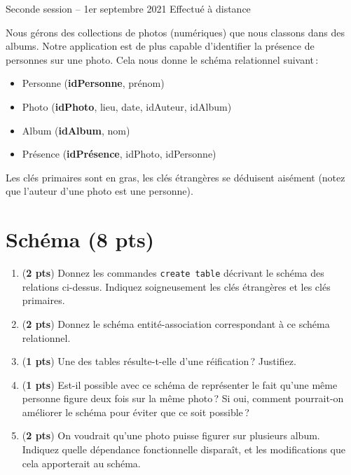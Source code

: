 %
{Seconde session -- 1er septembre 2021}%
{Effectué à distance}%

Nous gérons des collections de photos (numériques) que nous classons dans des albums. 
Notre application est de plus capable d'identifier la présence de personnes sur une
photo. Cela nous donne le schéma relationnel suivant\,:

      \begin{itemize}
        \item Personne (\textbf{idPersonne}, prénom)
        \item Photo (\textbf{idPhoto}, lieu, date, idAuteur, idAlbum)
        \item Album (\textbf{idAlbum}, nom)
        \item  Présence (\textbf{idPrésence}, idPhoto, idPersonne)
       \end{itemize}

Les clés primaires sont en gras, les clés étrangères se déduisent aisément (notez que l'auteur
d'une photo est une personne).


\section{Schéma (8 pts)}

\begin{enumerate}

   \item ({\bf 2 pts}) Donnez les commandes {\tt create table} décrivant
         le schéma des relations ci-dessus. Indiquez soigneusement
         les clés étrangères et les clés primaires.
   \item  ({\bf 2 pts}) Donnez le schéma entité-association correspondant à ce schéma relationnel.
   \item ({\bf 1 pts}) Une des tables résulte-t-elle d'une réification\,? Justifiez.
   \item ({\bf 1 pts}) Est-il possible avec ce schéma de représenter le fait qu'une même personne 
   figure deux fois sur la même photo\,? Si oui, comment pourrait-on améliorer le schéma pour éviter 
   que ce soit possible\,?
 
 \item ({\bf 2 pts}) On voudrait qu'une photo puisse figurer sur plusieurs album. Indiquez quelle
 dépendance fonctionnelle disparaît, et les modifications que cela apporterait au schéma.

\end{enumerate}

